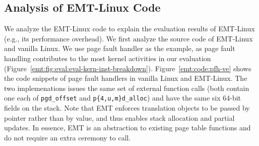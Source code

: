 \subsection{Analysis of EMT-Linux Code}
\label{emt:appendix:perf}

\noindent
We analyze the EMT-Linux code to explain 
  the evaluation results of EMT-Linux (e.g., its performance overhead).
We first analyze the source code of EMT-Linux and vanilla Linux.
We use page fault handler
  as the example, as page fault handling 
  contributes to the most kernel activities in our evaluation (Figure~\ref{emt:fig:eval:eval-kern-inst-breakdown}).
Figure~\ref{emt:code:pfh-ve} shows the code snippets of page fault handlers 
  in vanilla Linux 
  and EMT-Linux. 
The two implemenations issues the same set of external function calls
	(both contain one each of \texttt{\small pgd\_offset} and \texttt{\small p\{4,u,m\}d\_alloc})
	and have the same 
    six 64-bit fields on the stack.
Note that EMT enforces translation objects to be passed by pointer rather than by value,
    and thus enables stack allocation and partial updates.
In essence, EMT is an abstraction to existing page table functions
		and do not require an extra ceremony to call.

